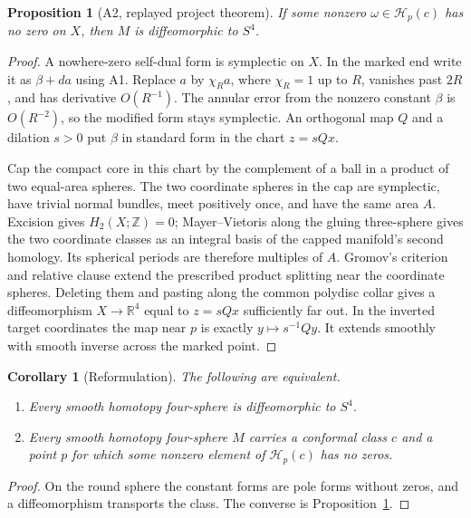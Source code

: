\documentclass[11pt,letterpaper]{article}
\numberwithin{equation}{section}
\newtheorem{proposition}[theorem]{Proposition}
\newtheorem{corollary}[theorem]{Corollary}
\begin{document}
\begin{proposition}[A2, replayed project theorem]\label{prop:recognition-pole}
If some nonzero \(\omega\in\mathcal H_p(c)\) has no zero on \(X\), then
\(M\) is diffeomorphic to \(S^4\).
\end{proposition}

\begin{proof}
A nowhere-zero self-dual form is symplectic on \(X\). In the marked end
write it as \(\beta+da\) using A1. Replace \(a\) by \(\chi_R a\), where
\(\chi_R=1\) up to \(R\), vanishes past \(2R\), and has derivative
\(O(R^{-1})\). The annular error from the nonzero constant \(\beta\) is
\(O(R^{-2})\), so the modified form stays symplectic. An orthogonal map
\(Q\) and a dilation \(s>0\) put \(\beta\) in standard form in the chart
\(z=sQx\).

Cap the compact core in this chart by the complement of a ball in a
product of two equal-area spheres. The two coordinate spheres in the cap
are symplectic, have trivial normal bundles, meet positively once, and
have the same area \(A\). Excision gives \(H_2(X;\mathbb Z)=0\);
Mayer--Vietoris along the gluing three-sphere gives the two coordinate
classes as an integral basis of the capped manifold's second homology.
Its spherical periods are therefore multiples of \(A\).
Gromov's criterion and relative clause
\cite[\S2.4.A$'_1$ and A$'_2$, p.~337]{Gromov1985PseudoHolomorphic}
extend the prescribed product splitting near the coordinate spheres.
Deleting them and pasting along the common polydisc collar gives a
diffeomorphism \(X\to\mathbb R^4\) equal to \(z=sQx\) sufficiently
far out. In the inverted target coordinates the map near \(p\) is
exactly \(y\mapsto s^{-1}Qy\). It extends smoothly with smooth inverse
across the marked point.
\end{proof}

\begin{corollary}[Reformulation]\label{cor:equivalence}
The following are equivalent.
\begin{enumerate}
\item Every smooth homotopy four-sphere is diffeomorphic to \(S^4\).
\item Every smooth homotopy four-sphere \(M\) carries a conformal class
\(c\) and a point \(p\) for which some nonzero element of
\(\mathcal H_p(c)\) has no zeros.
\end{enumerate}
\end{corollary}
\begin{proof}
On the round sphere the constant forms are pole forms without zeros,
and a diffeomorphism transports the class. The converse is
Proposition~\ref{prop:recognition-pole}.
\end{proof}
\end{document}
